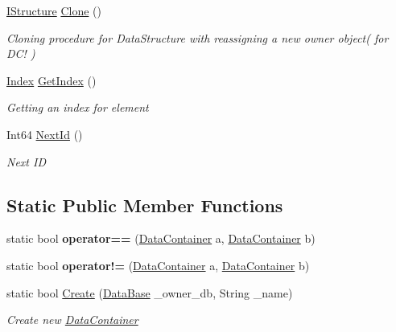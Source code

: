 \begin{DoxyCompactItemize}
\item 
\hyperlink{interface_dwarf_d_b_1_1_data_structures_1_1_i_structure}{I\+Structure} \hyperlink{class_dwarf_d_b_1_1_data_structures_1_1_data_container_a246c00add5642b9674339a0319bae617}{Clone} ()
\begin{DoxyCompactList}\small\item\em Cloning procedure for Data\+Structure with reassigning a new owner object( for D\+C! ) \end{DoxyCompactList}\item 
\hyperlink{class_dwarf_d_b_1_1_data_structures_1_1_index}{Index} \hyperlink{class_dwarf_d_b_1_1_data_structures_1_1_data_container_a195b9a3fcaa91d3240e07164c1d5c460}{Get\+Index} ()
\begin{DoxyCompactList}\small\item\em Getting an index for element \end{DoxyCompactList}\item 
Int64 \hyperlink{class_dwarf_d_b_1_1_data_structures_1_1_data_container_aa239b2d6a99537175c0c7e85f88c8d7e}{Next\+Id} ()
\begin{DoxyCompactList}\small\item\em Next I\+D \end{DoxyCompactList}\end{DoxyCompactItemize}
\subsection*{Static Public Member Functions}
\begin{DoxyCompactItemize}
\item 
\hypertarget{class_dwarf_d_b_1_1_data_structures_1_1_data_container_a7a47a45e62754b629dc06c57438a4eca}{static bool {\bfseries operator==} (\hyperlink{class_dwarf_d_b_1_1_data_structures_1_1_data_container}{Data\+Container} a, \hyperlink{class_dwarf_d_b_1_1_data_structures_1_1_data_container}{Data\+Container} b)}\label{class_dwarf_d_b_1_1_data_structures_1_1_data_container_a7a47a45e62754b629dc06c57438a4eca}

\item 
\hypertarget{class_dwarf_d_b_1_1_data_structures_1_1_data_container_aa59ee6235912ea37a590efe9a147b704}{static bool {\bfseries operator!=} (\hyperlink{class_dwarf_d_b_1_1_data_structures_1_1_data_container}{Data\+Container} a, \hyperlink{class_dwarf_d_b_1_1_data_structures_1_1_data_container}{Data\+Container} b)}\label{class_dwarf_d_b_1_1_data_structures_1_1_data_container_aa59ee6235912ea37a590efe9a147b704}

\item 
static bool \hyperlink{class_dwarf_d_b_1_1_data_structures_1_1_data_container_a57324435e4d7961b4b875588b9a86f3d}{Create} (\hyperlink{class_dwarf_d_b_1_1_data_structures_1_1_data_base}{Data\+Base} \+\_\+owner\+\_\+db, String \+\_\+name)
\begin{DoxyCompactList}\small\item\em Create new \hyperlink{class_dwarf_d_b_1_1_data_structures_1_1_data_container}{Data\+Container} \end{DoxyCompactList}\end{DoxyCompactItemize}
